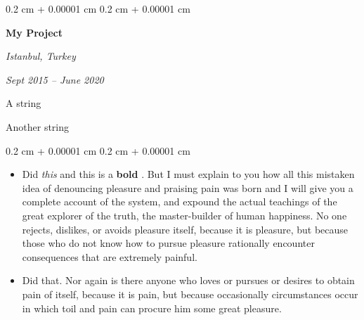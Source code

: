 \documentclass[10pt, letterpaper]{article}
\newenvironment{summary}{
    \begin{description}[
        topsep=0.10 cm,
        parsep=0.10 cm,
        partopsep=0pt,
        itemsep=0pt,
        leftmargin=0.4 cm + 10pt
    ]
}{
    \end{description}
} %
\newenvironment{highlights}{
    \begin{itemize}[
        topsep=0.10 cm,
        parsep=0.10 cm,
        partopsep=0pt,
        itemsep=0pt,
        leftmargin=0.4 cm + 10pt
    ]
}{
    \end{itemize}
} %
\newenvironment{onecolentry}{
    \begin{adjustwidth}{
        0.2 cm + 0.00001 cm
    }{
        0.2 cm + 0.00001 cm
    }
}{
    \end{adjustwidth}
} %
\newenvironment{twocolentry}[2][]{
    \onecolentry
    \def\secondColumn{#2}
    \setcolumnwidth{\fill, 4.5 cm}
    \begin{paracol}{2}
}{
    \switchcolumn \raggedleft \secondColumn
    \end{paracol}
    \endonecolentry
} %
\let\hrefWithoutArrow\href
\renewcommand{\href}[2]{\hrefWithoutArrow{#1}{\ifthenelse{\equal{#2}{}}{ }{#2 }\raisebox{.15ex}{\footnotesize \faExternalLink*}}}
\begin{document}
        \begin{twocolentry}{
        \textit{Istanbul, Turkey}    
            
        \textit{Sept 2015 – June 2020}}
            \textbf{My Project}
        \end{twocolentry}
            \begin{summary}
                \item A string
                \item Another string
            \end{summary}
        \vspace{0.10 cm}
        \begin{onecolentry}
            \begin{highlights}
                \item Did \textit{this} and this is a \textbf{bold} \href{https://example.com}{link}. But I must explain to you how all this mistaken idea of denouncing pleasure and praising pain was born and I will give you a complete account of the system, and expound the actual teachings of the great explorer of the truth, the master-builder of human happiness. No one rejects, dislikes, or avoids pleasure itself, because it is pleasure, but because those who do not know how to pursue pleasure rationally encounter consequences that are extremely painful.
                \item Did that. Nor again is there anyone who loves or pursues or desires to obtain pain of itself, because it is pain, but because occasionally circumstances occur in which toil and pain can procure him some great pleasure.
            \end{highlights}
        \end{onecolentry}


        \vspace{0.2 cm}
\end{document}
